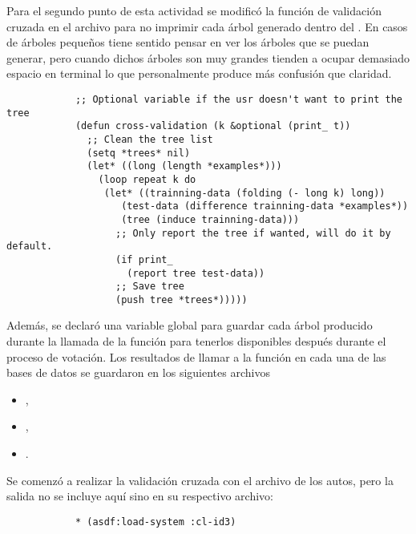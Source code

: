 \begin{itemize}
\begin{solution}
        Para el segundo punto de esta actividad se modificó la función de validación cruzada  en el archivo  para no imprimir cada árbol generado dentro del . En casos de árboles pequeños tiene sentido pensar en ver los árboles que se puedan generar, pero cuando dichos árboles son muy grandes tienden a ocupar demasiado espacio en terminal lo que personalmente produce más confusión que claridad.
        \begin{verbatim}
            ;; Optional variable if the usr doesn't want to print the tree
            (defun cross-validation (k &optional (print_ t))
              ;; Clean the tree list
              (setq *trees* nil)
              (let* ((long (length *examples*)))
                (loop repeat k do
                 (let* ((trainning-data (folding (- long k) long))
                    (test-data (difference trainning-data *examples*))
                    (tree (induce trainning-data)))
                   ;; Only report the tree if wanted, will do it by default.
                   (if print_
                     (report tree test-data))
                   ;; Save tree
                   (push tree *trees*)))))
        \end{verbatim}

        Además, se declaró una variable global  para guardar cada árbol producido durante la llamada de la función para tenerlos disponibles después durante el proceso de votación. Los resultados de llamar a la función  en cada una de las bases de datos se guardaron en los siguientes archivos
        \begin{itemize}
            \item {},
            \item {},
            \item {}.
        \end{itemize}

        Se comenzó a realizar la validación cruzada con el archivo de los autos, pero la salida no se incluye aquí sino en su respectivo archivo:
        \begin{verbatim}
            * (asdf:load-system :cl-id3)


\end{verbatim}
\end{solution}
\end{itemize}
